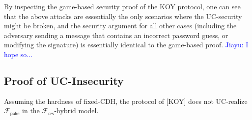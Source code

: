 \documentclass[10pt,a4paper]{article}
\def\xjy#1{\textcolor{blue}{Jiayu: #1}}
\begin{document}
By inspecting the game-based security proof of the KOY protocol, one can see that the above attacks are essentially the only scenarios where the UC-security might be broken, and the security argument for all other cases (including the adversary sending a message that contains an incorrect password guess, or modifying the signature) is essentially identical to the game-based proof. \xjy{I hope so...}

	\subsection{Proof of UC-Insecurity}

	\begin{theorem}
		Assuming the hardness of fixed-CDH, the protocol of [KOY] does not UC-realize $\mathcal{F}_\mathsf{pake}$ in the $\mathcal{F}_{\mathsf{crs}}$-hybrid model.
	\end{theorem}
\end{document}
